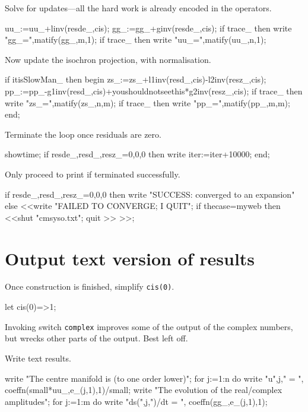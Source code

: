 \documentclass[11pt,a5paper]{article}
\begin{document}
Solve for updates---all the hard work is already encoded in the operators.
\begin{reduce}
uu_:=uu_+linv(resde_,cis);
gg_:=gg_+ginv(resde_,cis);
if trace_ then write "gg_=",matify(gg_,m,1);
if trace_ then write "uu_=",matify(uu_,n,1);
\end{reduce}

Now update the isochron projection, with normalisation.
\begin{reduce}
if itisSlowMan_ then begin
zs_:=zs_+l1inv(resd_,cis)-l2inv(resz_,cis);
pp_:=pp_-g1inv(resd_,cis)+youshouldnotseethis*g2inv(resz_,cis);
if trace_ then write "zs_=",matify(zs_,n,m);
if trace_ then write "pp_=",matify(pp_,m,m);
end;
\end{reduce}


Terminate the loop once residuals are zero.

\begin{reduce}
showtime;
if {resde_,resd_,resz_}={0,0,0} then write iter:=iter+10000;
end;
\end{reduce}

Only proceed to print if terminated successfully.

\begin{reduce}
if {resde_,resd_,resz_}={0,0,0} 
  then write "SUCCESS: converged to an expansion"
  else <<write "FAILED TO CONVERGE; I QUIT";
    if thecase=myweb then <<shut "cmsyso.txt"; 
    quit >> >>;
\end{reduce}


\begin{reduce}
\end{reduce}


\section{Output text version of results}

Once construction is finished, simplify \verb|cis(0)|.

\begin{reduce}
let cis(0)=>1;
\end{reduce}

Invoking switch \verb|complex| improves some of the output of the complex numbers, but wrecks other parts of the output.  Best left off.


Write text results.
\begin{reduce}
write "The centre manifold is (to one order lower)";
for j:=1:n do write "u",j," = ",
  coeffn(small*uu_,e_(j,1),1)/small;
write "The evolution of the real/complex amplitudes";
for j:=1:m do write "ds(",j,")/dt = ",
  coeffn(gg_,e_(j,1),1);
\end{reduce}
\end{document}
